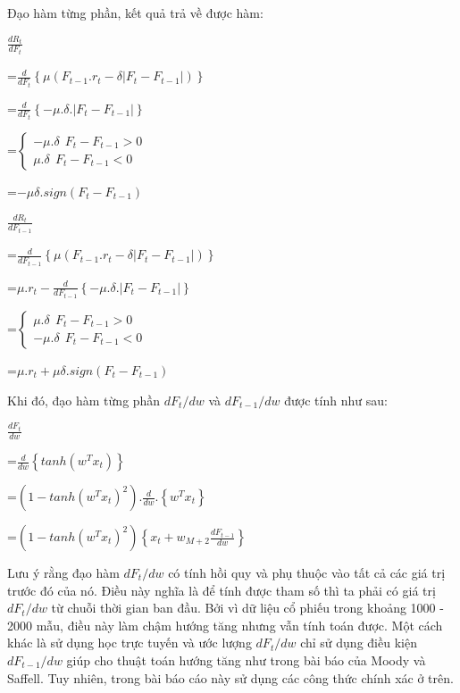 \documentclass[14pt]{extreport}
\begin{document}
Đạo hàm từng phần, kết quả trả về được hàm:

$\frac{dR_t}{dF_t}$

=$\frac{d}{dF_t}\left \{ \mu\left ( F_{t-1}.r_t-\delta\left | F_t-F_{t-1} \right | \right ) \right \}$


=$\frac{d}{dF_t}\left \{ -\mu.\delta.\left | F_t-F_{t-1} \right | \right \}$


=$\left\{\begin{matrix}
 -\mu.\delta \ \  F_t-F_{t-1}>0  & \\ 
 \mu.\delta \ \ F_t-F_{t-1}<0
\end{matrix}\right.$


=$-\mu\delta.sign\left ( F_t-F_{t-1} \right )$

$\frac{dR_t}{dF_{t-1}}$


=$\frac{d}{dF_{t-1}}\left \{ \mu\left ( F_{t-1}.r_t-\delta\left | F_t-F_{t-1} \right | \right ) \right \}$


=$\mu.r_t-\frac{d}{dF_{t-1}}\left \{ -\mu.\delta.\left | F_t-F_{t-1} \right | \right \}$


=$\left\{\begin{matrix}
 \mu.\delta \ \  F_t-F_{t-1}>0  & \\ 
 -\mu.\delta \ \ F_t-F_{t-1}<0
\end{matrix}\right.$


=$\mu.r_t+\mu \delta.sign\left ( F_t-F_{t-1} \right )$


Khi đó, đạo hàm từng phần $dF_t/dw$ và $dF_{t-1}/dw$ được tính như sau:

$\frac{dF_t}{dw}$


=$\frac{d}{dw}\left \{ tanh(w^Tx_t) \right \}$


=$\left ( 1-tanh\left ( w^Tx_t \right )^2 \right ).\frac{d}{dw}.\left \{ w^Tx_t \right \}$


=$\left ( 1-tanh\left ( w^Tx_t \right )^2 \right )\left \{ x_t+w_{M+2} \frac{dF_{t-1}}{dw} \right \}$

Lưu ý rằng đạo hàm $dF_t/dw$ có tính hồi quy và phụ thuộc vào tất cả các giá trị trước đó của nó. Điều này nghĩa là để tính được tham số thì ta phải có giá trị $dF_t/dw$ từ chuỗi thời gian ban đầu. Bởi vì dữ liệu cổ phiếu trong khoảng 1000 - 2000 mẫu, điều này làm chậm hướng tăng nhưng vẫn tính toán được. Một cách khác là sử dụng học trực tuyến và ước lượng $dF_t/dw$ chỉ sử dụng điều kiện $dF_{t-1}/dw$ giúp cho thuật toán hướng tăng như trong bài báo của Moody và Saffell. Tuy nhiên, trong bài báo cáo này sử dụng các công thức chính xác ở trên.
\end{document}
